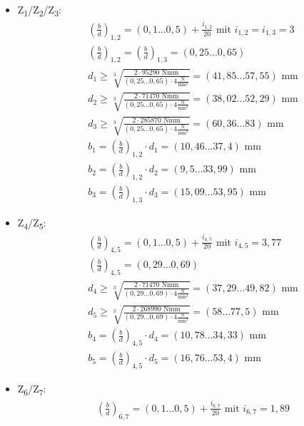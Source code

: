 \begin{itemize}
\item {Z\textsubscript{1}/Z\textsubscript{2}/Z\textsubscript{3}:}
\begin{align*}
	& \left(\frac{b}{d} \right) _{1,2} = (0,1...0,5) + \frac{i_{1,2}}{20} \text{ mit } i_{1,2} = i_{1,3}= 3 \\
	&\left(\frac{b}{d} \right) _{1,2}= \left(\frac{b}{d} \right) _{1,3} = (0,25...0,65) \\
	&d_1 \ge \sqrt[3]{\frac{2 \cdot 95290 \text{ Nmm}}{(0,25...0,65) \cdot  4 \frac{\text{N}}{\text{mm}^2}}}= (41,85...57,55) \text{ mm}\\
	&d_2 \ge \sqrt[3]{\frac{2 \cdot 71470 \text{ Nmm}}{(0,25...0,65) \cdot  4 \frac{\text{N}}{\text{mm}^2}}}= (38,02...52,29) \text{ mm}  \\
	&d_3 \ge \sqrt[3]{\frac{2 \cdot 285870 \text{ Nmm}}{(0,25...0,65) \cdot  4 \frac{\text{N}}{\text{mm}^2}}}= (60,36...83) \text{ mm}\\
	&b_1= \left(\frac{b}{d} \right) _{1,2}  \cdot d_1 = (10,46...37,4) \text{ mm}  \\
	&b_2= \left(\frac{b}{d} \right) _{1,2}  \cdot d_2 = (9,5...33,99) \text{ mm}  \\
	&b_3= \left(\frac{b}{d} \right) _{1,3}  \cdot d_3 = (15,09...53,95) \text{ mm}  
\end{align*}
\item {Z\textsubscript{4}/Z\textsubscript{5}:}
\begin{align*}
	& \left(\frac{b}{d} \right) _{4,5} = (0,1...0,5) + \frac{i_{4,5}}{20} \text{ mit } i_{4,5} =  3,77 \\
	&\left(\frac{b}{d} \right) _{4,5}=  (0,29...0,69) \\
	&d_4 \ge \sqrt[3]{\frac{2 \cdot 71470 \text{ Nmm}}{(0,29...0,69) \cdot  4 \frac{\text{N}}{\text{mm}^2}}}= (37,29...49,82) \text{ mm}\\
	&d_5 \ge \sqrt[3]{\frac{2 \cdot 268990 \text{ Nmm}}{(0,29...0,69) \cdot  4 \frac{\text{N}}{\text{mm}^2}}}= (58...77,5) \text{ mm}  \\
	&b_4= \left(\frac{b}{d} \right) _{4,5}  \cdot d_4 = (10,78...34,33) \text{ mm}  \\
	&b_5= \left(\frac{b}{d} \right) _{4,5}  \cdot d_5 = (16,76...53,4) \text{ mm}  
\end{align*}
\item {Z\textsubscript{6}/Z\textsubscript{7}:}
\begin{align*}
	& \left(\frac{b}{d} \right) _{6,7} = (0,1...0,5) + \frac{i_{6,7}}{20} \text{ mit } i_{6,7} =  1,89 \\

\end{align*}
\end{itemize}
